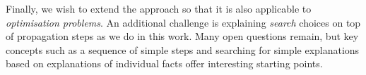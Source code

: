 Finally, we wish to extend the approach so that it is also applicable to \textit{optimisation problems}. An additional challenge is explaining \textit{search} choices on top of propagation steps as we do in this work. Many open questions remain, but key concepts such as a sequence of simple steps and searching for simple explanations based on explanations of individual facts offer interesting starting points.


% 
